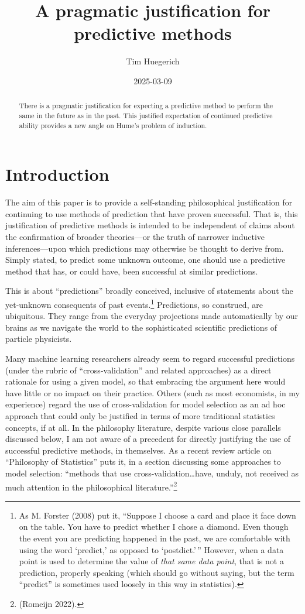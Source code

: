 \documentclass[
  letterpaper,
  DIV=11,
  numbers=noendperiod]{scrartcl}
\title{A pragmatic justification for predictive methods}
\author{Tim Huegerich}
\date{2025-03-09}
\theoremstyle{definition}
\theoremstyle{remark}
\begin{document}
\maketitle
\begin{abstract}
There is a pragmatic justification for expecting a predictive method to
perform the same in the future as in the past. This justified
expectation of continued predictive ability provides a new angle on
Hume's problem of induction.
\end{abstract}


\section{Introduction}\label{introduction}

The aim of this paper is to provide a self-standing philosophical
justification for continuing to use methods of prediction that have
proven successful. That is, this justification of predictive methods is
intended to be independent of claims about the confirmation of broader
theories---or the truth of narrower inductive inferences---upon which
predictions may otherwise be thought to derive from. Simply stated, to
predict some unknown outcome, one should use a predictive method that
has, or could have, been successful at similar predictions.

This is about ``predictions'' broadly conceived, inclusive of statements
about the yet-unknown consequents of past events.\footnote{As M. Forster
  (2008) put it, ``Suppose I choose a card and place it face down on the
  table. You have to predict whether I chose a diamond. Even though the
  event you are predicting happened in the past, we are comfortable with
  using the word `predict,' as opposed to `postdict.'\,'' However, when
  a data point is used to determine the value of \emph{that same data
  point}, that is not a prediction, properly speaking (which should go
  without saying, but the term ``predict'' is sometimes used loosely in
  this way in statistics).} Predictions, so construed, are ubiquitous.
They range from the everyday projections made automatically by our
brains as we navigate the world to the sophisticated scientific
predictions of particle physicists.

Many machine learning researchers already seem to regard successful
predictions (under the rubric of ``cross-validation'' and related
approaches) as a direct rationale for using a given model, so that
embracing the argument here would have little or no impact on their
practice. Others (such as most economists, in my experience) regard the
use of cross-validation for model selection as an ad hoc approach that
could only be justified in terms of more traditional statistics
concepts, if at all. In the philosophy literature, despite various close
parallels discussed below, I am not aware of a precedent for directly
justifying the use of successful predictive methods, in themselves. As a
recent review article on ``Philosophy of Statistics'' puts it, in a
section discussing some approaches to model selection: ``methods that
use cross-validation\ldots have, unduly, not received as much attention
in the philosophical literature.''\footnote{(Romeijn 2022).}
\end{document}
